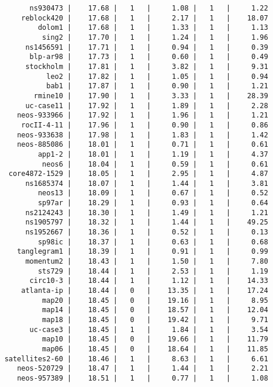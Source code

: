 \begin{verbatim}
          ns930473 |    17.68 |   1   |     1.08 |   1   |     1.22
        reblock420 |    17.68 |   1   |     2.17 |   1   |    18.07
            dolom1 |    17.68 |   1   |     1.33 |   1   |     1.13
             sing2 |    17.70 |   1   |     1.24 |   1   |     1.96
         ns1456591 |    17.71 |   1   |     0.94 |   1   |     0.39
          blp-ar98 |    17.73 |   1   |     0.60 |   1   |     0.49
         stockholm |    17.81 |   1   |     3.82 |   1   |     9.31
              leo2 |    17.82 |   1   |     1.05 |   1   |     0.94
              bab1 |    17.87 |   1   |     0.90 |   1   |     1.21
           rmine10 |    17.90 |   1   |     3.33 |   1   |    28.39
         uc-case11 |    17.92 |   1   |     1.89 |   1   |     2.28
       neos-933966 |    17.92 |   1   |     1.96 |   1   |     1.21
        rocII-4-11 |    17.96 |   1   |     0.90 |   1   |     0.86
       neos-933638 |    17.98 |   1   |     1.83 |   1   |     1.42
       neos-885086 |    18.01 |   1   |     0.71 |   1   |     0.61
            app1-2 |    18.01 |   1   |     1.19 |   1   |     4.37
             neos6 |    18.04 |   1   |     0.59 |   1   |     0.61
     core4872-1529 |    18.05 |   1   |     2.95 |   1   |     4.87
         ns1685374 |    18.07 |   1   |     1.44 |   1   |     3.81
            neos13 |    18.09 |   1   |     0.67 |   1   |     0.52
            sp97ar |    18.29 |   1   |     0.93 |   1   |     0.64
         ns2124243 |    18.30 |   1   |     1.49 |   1   |     1.21
         ns1905797 |    18.32 |   1   |     1.44 |   1   |    49.25
         ns1952667 |    18.36 |   1   |     0.52 |   1   |     0.13
            sp98ic |    18.37 |   1   |     0.63 |   1   |     0.68
       tanglegram1 |    18.39 |   1   |     0.91 |   1   |     0.99
         momentum2 |    18.43 |   1   |     1.50 |   1   |     7.80
            sts729 |    18.44 |   1   |     2.53 |   1   |     1.19
          circ10-3 |    18.44 |   1   |     1.12 |   1   |    14.33
        atlanta-ip |    18.44 |   0   |    13.35 |   1   |    17.24
             map20 |    18.45 |   0   |    19.16 |   1   |     8.95
             map14 |    18.45 |   0   |    18.57 |   1   |    12.04
             map18 |    18.45 |   0   |    19.42 |   1   |     9.71
          uc-case3 |    18.45 |   1   |     1.84 |   1   |     3.54
             map10 |    18.45 |   0   |    19.66 |   1   |    11.79
             map06 |    18.45 |   0   |    18.64 |   1   |    11.85
    satellites2-60 |    18.46 |   1   |     8.63 |   1   |     6.61
       neos-520729 |    18.47 |   1   |     1.44 |   1   |     2.21
       neos-957389 |    18.51 |   1   |     0.77 |   1   |     1.08

\end{verbatim}
